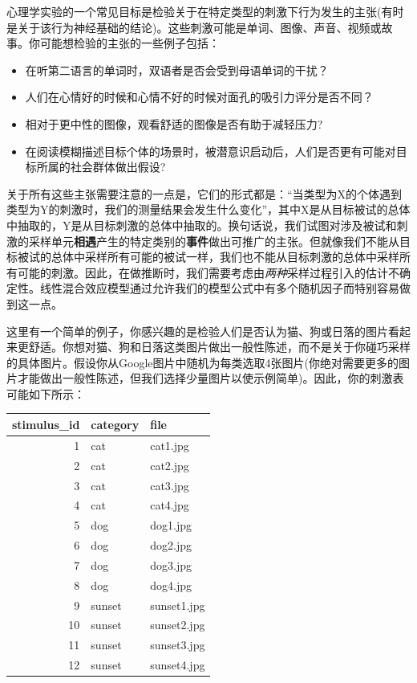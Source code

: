 \documentclass[
]{book}
\providecommand{\tightlist}{%
  \setlength{\itemsep}{0pt}\setlength{\parskip}{0pt}}
\begin{document}
心理学实验的一个常见目标是检验关于在特定类型的刺激下行为发生的主张(有时是关于该行为神经基础的结论)。这些刺激可能是单词、图像、声音、视频或故事。你可能想检验的主张的一些例子包括：

\begin{itemize}
\tightlist
\item
  在听第二语言的单词时，双语者是否会受到母语单词的干扰？
\item
  人们在心情好的时候和心情不好的时候对面孔的吸引力评分是否不同？
\item
  相对于更中性的图像，观看舒适的图像是否有助于减轻压力?
\item
  在阅读模糊描述目标个体的场景时，被潜意识启动后，人们是否更有可能对目标所属的社会群体做出假设?
\end{itemize}

关于所有这些主张需要注意的一点是，它们的形式都是：``当类型为X的个体遇到类型为Y的刺激时，我们的测量结果会发生什么变化''，其中X是从目标被试的总体中抽取的，Y是从目标刺激的总体中抽取的。换句话说，我们试图对涉及被试和刺激的采样单元\textbf{相遇}产生的特定类别的\textbf{事件}做出可推广的主张\citep{Barr_2017}。但就像我们不能从目标被试的总体中采样所有可能的被试一样，我们也不能从目标刺激的总体中采样所有可能的刺激。因此，在做推断时，我们需要考虑由\emph{两种}采样过程引入的估计不确定性\citep{Coleman_1964, Clark_1973, Judd_Westfall_Kenny_2012, yarkoni_2019}。线性混合效应模型通过允许我们的模型公式中有多个随机因子而特别容易做到这一点\citep{Baayen_Davidson_Bates_2008}。

这里有一个简单的例子，你感兴趣的是检验人们是否认为猫、狗或日落的图片看起来更舒适。你想对猫、狗和日落这类图片做出一般性陈述，而不是关于你碰巧采样的具体图片。假设你从Google图片中随机为每类选取4张图片(你绝对需要更多的图片才能做出一般性陈述，但我们选择少量图片以使示例简单)。因此，你的刺激表可能如下所示：

\begin{tabular}{r|l|l}
\hline
stimulus\_id & category & file\\
\hline
1 & cat & cat1.jpg\\
\hline
2 & cat & cat2.jpg\\
\hline
3 & cat & cat3.jpg\\
\hline
4 & cat & cat4.jpg\\
\hline
5 & dog & dog1.jpg\\
\hline
6 & dog & dog2.jpg\\
\hline
7 & dog & dog3.jpg\\
\hline
8 & dog & dog4.jpg\\
\hline
9 & sunset & sunset1.jpg\\
\hline
10 & sunset & sunset2.jpg\\
\hline
11 & sunset & sunset3.jpg\\
\hline
12 & sunset & sunset4.jpg\\
\hline
\end{tabular}
\end{document}
